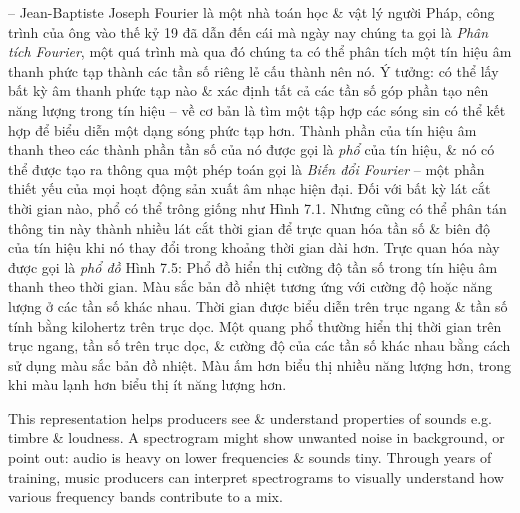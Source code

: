 \documentclass{article}
\begin{document}
\begin{itemize}
\begin{itemize}
		-- {\sc Jean-Baptiste Joseph Fourier} là một nhà toán học \& vật lý người Pháp, công trình của ông vào thế kỷ 19 đã dẫn đến cái mà ngày nay chúng ta gọi là {\it Phân tích Fourier}, một quá trình mà qua đó chúng ta có thể phân tích một tín hiệu âm thanh phức tạp thành các tần số riêng lẻ cấu thành nên nó. Ý tưởng: có thể lấy bất kỳ âm thanh phức tạp nào \& xác định tất cả các tần số góp phần tạo nên năng lượng trong tín hiệu -- về cơ bản là tìm một tập hợp các sóng sin có thể kết hợp để biểu diễn một dạng sóng phức tạp hơn. Thành phần của tín hiệu âm thanh theo các thành phần tần số của nó được gọi là {\it phổ} của tín hiệu, \& nó có thể được tạo ra thông qua một phép toán gọi là {\it Biến đổi Fourier} -- một phần thiết yếu của mọi hoạt động sản xuất âm nhạc hiện đại. Đối với bất kỳ lát cắt thời gian nào, phổ có thể trông giống như {\sf Hình 7.1.} Nhưng cũng có thể phân tán thông tin này thành nhiều lát cắt thời gian để trực quan hóa tần số \& biên độ của tín hiệu khi nó thay đổi trong khoảng thời gian dài hơn. Trực quan hóa này được gọi là {\it phổ đồ} {\sf Hình 7.5: Phổ đồ hiển thị cường độ tần số trong tín hiệu âm thanh theo thời gian. Màu sắc bản đồ nhiệt tương ứng với cường độ hoặc năng lượng ở các tần số khác nhau. Thời gian được biểu diễn trên trục ngang \& tần số tính bằng kilohertz trên trục dọc.} Một quang phổ thường hiển thị thời gian trên trục ngang, tần số trên trục dọc, \& cường độ của các tần số khác nhau bằng cách sử dụng màu sắc bản đồ nhiệt. Màu ấm hơn biểu thị nhiều năng lượng hơn, trong khi màu lạnh hơn biểu thị ít năng lượng hơn.
		
		This representation helps producers see \& understand properties of sounds e.g. timbre \& loudness. A spectrogram might show unwanted noise in background, or point out: audio is heavy on lower frequencies \& sounds tiny. Through years of training, music producers can interpret spectrograms to visually understand how various frequency bands contribute to a mix.
		

\end{itemize}
\end{itemize}
\end{document}
